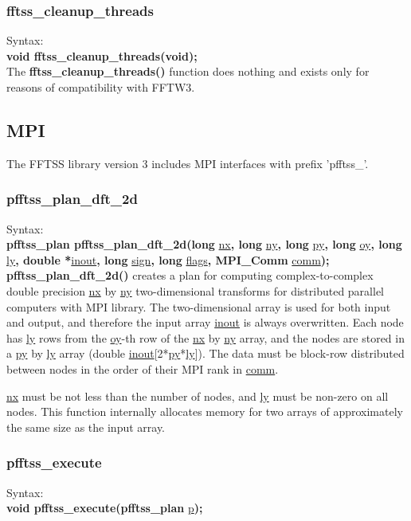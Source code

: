 \documentclass{article}
\begin{document}
\subsubsection{fftss\_cleanup\_threads}
Syntax:\\
{\bf  void fftss\_cleanup\_threads(void);}\\

The {\bf fftss\_cleanup\_threads()} function does nothing and exists only for reasons of compatibility with FFTW3.

\subsection{MPI}
The FFTSS library version 3 includes MPI interfaces with
prefix 'pfftss\_'.
\subsubsection{pfftss\_plan\_dft\_2d}
Syntax:\\
{\bf pfftss\_plan pfftss\_plan\_dft\_2d(long }\underline{nx}{\bf, long }\underline{ny}{\bf, long }\underline{py}{\bf, long }\underline{oy}{\bf, long }\underline{ly}{\bf, double *}\underline{inout}{\bf, long }\underline{sign}{\bf, long }\underline{flags}{\bf, MPI\_Comm }\underline{comm}{\bf );}\\

{\bf pfftss\_plan\_dft\_2d()} creates a plan for computing complex-to-complex
double precision \underline{nx} by \underline{ny} two-dimensional transforms
for distributed parallel computers with MPI library.
The two-dimensional array is used for both input and output, and therefore
the input array \underline{inout} is always overwritten. Each node has 
\underline{ly} rows from the \underline{oy}-th row of 
the \underline{nx} by \underline{ny} array, and the nodes are stored in a
\underline{py} by \underline{ly} array (double \underline{inout}[2*\underline{py}*\underline{ly}]). The data must be block-row distributed between nodes in the order of their MPI rank in \underline{comm}.

\underline{nx} must be not less than the number of nodes, and
\underline{ly} must be non-zero on all nodes.
This function internally allocates memory for two arrays 
of approximately the same size as the input array.


\subsubsection{pfftss\_execute}
Syntax:\\
{\bf void pfftss\_execute(pfftss\_plan }\underline{p}{\bf);}\\
\end{document}

